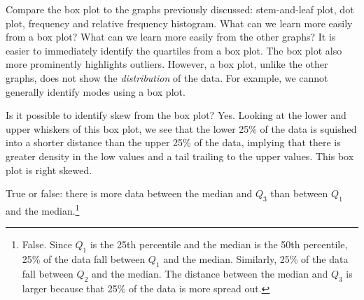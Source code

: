 \begin{example}{Compare the box plot to the graphs previously discussed: stem-and-leaf plot, dot plot, frequency and relative frequency histogram. What can we learn more easily from a box plot? What can we learn more easily from the other graphs?}
It is easier to immediately identify the quartiles from a box plot. The box plot also more prominently highlights outliers. However, a box plot, unlike the other graphs, does not show the \emph{distribution} of the data. For example, we cannot generally identify modes using a box plot.
\end{example}

\begin{example}
{Is it possible to identify skew from the box plot?} Yes. Looking at the lower and upper whiskers of this box plot, we see that the lower 25\% of the data is squished into a shorter distance than the upper 25\% of the data, implying that there is greater density in the low values and a tail trailing to the upper values. This box plot is right skewed.
\end{example}

\begin{exercise}
True or false: there is more data between the median and $Q_3$ than between $Q_1$ and the median.\footnote{False. Since $Q_1$ is the 25th percentile and the median is the 50th percentile, 25\% of the data fall between $Q_1$ and the median. Similarly, 25\% of the data fall between $Q_2$ and the median. The distance between the median and $Q_3$ is larger because that 25\% of the data is more spread out.}
\end{exercise}

